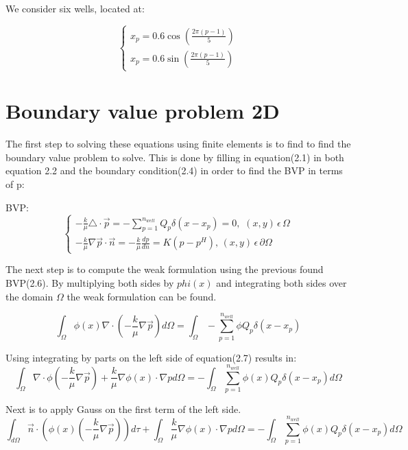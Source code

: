 \documentclass{report}
\begin{document}
We consider six wells, located at:


\begin{equation}
	\begin{cases} 
		x_p=0.6\cos(\frac{2\pi (p-1)}{5}) \\ x_p=0.6\sin(\frac{2\pi (p-1)}{5})
	\end{cases} 
\end{equation}


\section{Boundary value problem 2D}
The first step to solving these equations using finite elements is to find to find the boundary value problem to solve. This is done by filling in equation(2.1) in both equation 2.2 and the boundary condition(2.4) in order to find the BVP in terms of p:
\vspace{5mm}

BVP:
\begin{equation}
	\begin{cases}
		-\frac{k}{\mu}\triangle\cdot\vec{p}=-\sum_{p=1}^{n_{well}}Q_p\delta(x-x_p)=0,\, \, (x,y) \, \epsilon \, \Omega\\
		-\frac{k}{\mu}\nabla\vec{p}\cdot\vec{n}=-\frac{k}{\mu}\frac{dp}{dn} =K(p-p^H), \, (x,y)\,  \epsilon  \, \partial\Omega
	\end{cases}
\end{equation}

\bigskip

The next step is to compute the weak formulation using the previous found BVP(2.6). By multiplying both sides by $phi(x)$ and integrating both sides over the domain $\Omega$ the weak formulation can be found.

\begin{equation}
	\int_{\Omega}\phi(x)\nabla\cdot( -\frac{k}{\mu}\nabla\vec{p}) d\Omega =\int_{\Omega}-\sum_{p=1}^{n_{well}}\phi  Q_p\delta(x-x_p)
\end{equation}

Using integrating by parts on the left side of equation(2.7) results in:
\begin{equation}
	\int_{\Omega}\nabla\cdot\phi(-\frac{k}{\mu}\nabla\vec{p})+\frac{k}{\mu}\nabla\phi(x)\cdot\nabla p d\Omega= -\int_{\Omega}\sum_{p=1}^{n_{well}}\phi(x) Q_p\delta(x-x_p)d\Omega
\end{equation}

Next is to apply Gauss on the first term of the left side.
\begin{equation}
	\int_{d\Omega}\vec{n}\cdot(\phi(x)(-\frac{k}{\mu}\nabla\vec{p}))d\tau+\int_{\Omega}\frac{k}{\mu}\nabla\phi(x)\cdot\nabla p d\Omega= -\int_{\Omega}\sum_{p=1}^{n_{well}}\phi(x) Q_p\delta(x-x_p)d\Omega
\end{equation}
\end{document}
